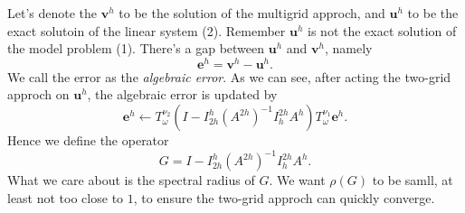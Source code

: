 \documentclass{SBCbookchapter}
\begin{document}
Let's denote the $\mathbf{v}^h$ to be the solution of the multigrid approch, and $\mathbf{u}^h$ to be the exact solutoin of the linear system (2). Remember $\mathbf{u}^h$ is not the exact solution of the model problem (1). There's a gap between $\mathbf{u}^h$ and $\mathbf{v}^h$, namely
\begin{equation}
	\mathbf{e}^h=\mathbf{v}^h-\mathbf{u}^h.
\end{equation}
We call the error as the \textit{algebraic error}. As we can see, after acting the two-grid approch on $\mathbf{u}^h$, the algebraic error is updated by
\begin{equation}
	\mathbf{e}^h\gets T_\omega^{\nu_2}\left(I-I_{2h}^h\left(A^{2h}\right)^{-1}I_h^{2h}A^h\right)T_\omega^{\nu_1}\mathbf{e}^h.
\end{equation}
Hence we define the operator
\begin{equation}
	G=I-I_{2h}^h\left(A^{2h}\right)^{-1}I_h^{2h}A^h.
\end{equation}
What we care about is the spectral radius of $G$. We want $\rho(G)$ to be samll, at least not too close to $1$, to ensure the two-grid approch can quickly converge.
\end{document}
